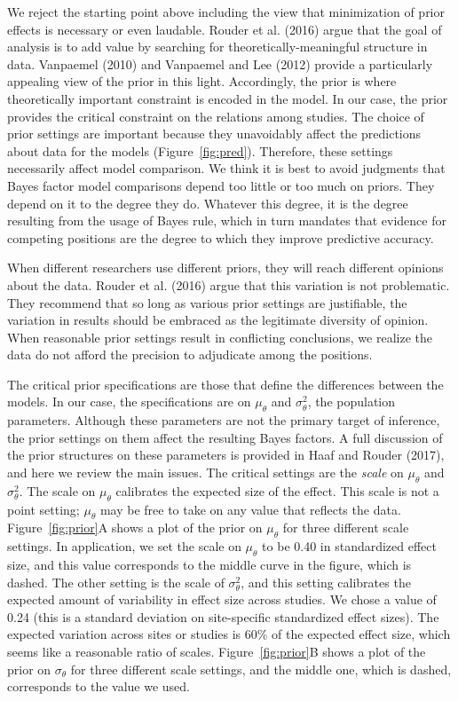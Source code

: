 \documentclass[english,man]{apa6}
\theoremstyle{definition}
\theoremstyle{definition}
\theoremstyle{definition}
\theoremstyle{remark}
\begin{document}
We reject the starting point above including the view that minimization
of prior effects is necessary or even laudable. Rouder et al. (2016)
argue that the goal of analysis is to add value by searching for
theoretically-meaningful structure in data. Vanpaemel (2010) and
Vanpaemel and Lee (2012) provide a particularly appealing view of the
prior in this light. Accordingly, the prior is where theoretically
important constraint is encoded in the model. In our case, the prior
provides the critical constraint on the relations among studies. The
choice of prior settings are important because they unavoidably affect
the predictions about data for the models (Figure~\ref{fig:pred}).
Therefore, these settings necessarily affect model comparison. We think
it is best to avoid judgments that Bayes factor model comparisons depend
too little or too much on priors. They depend on it to the degree they
do. Whatever this degree, it is the degree resulting from the usage of
Bayes rule, which in turn mandates that evidence for competing positions
are the degree to which they improve predictive accuracy.

When different researchers use different priors, they will reach
different opinions about the data. Rouder et al. (2016) argue that this
variation is not problematic. They recommend that so long as various
prior settings are justifiable, the variation in results should be
embraced as the legitimate diversity of opinion. When reasonable prior
settings result in conflicting conclusions, we realize the data do not
afford the precision to adjudicate among the positions.

The critical prior specifications are those that define the differences
between the models. In our case, the specifications are on
\(\mu_\theta\) and \(\sigma^2_\theta\), the population parameters.
Although these parameters are not the primary target of inference, the
prior settings on them affect the resulting Bayes factors. A full
discussion of the prior structures on these parameters is provided in
Haaf and Rouder (2017), and here we review the main issues. The critical
settings are the \emph{scale} on \(\mu_\theta\) and \(\sigma^2_\theta\).
The scale on \(\mu_\theta\) calibrates the expected size of the effect.
This scale is not a point setting; \(\mu_\theta\) may be free to take on
any value that reflects the data. Figure~\ref{fig:prior}A shows a plot
of the prior on \(\mu_\theta\) for three different scale settings. In
application, we set the scale on \(\mu_\theta\) to be 0.40 in
standardized effect size, and this value corresponds to the middle curve
in the figure, which is dashed. The other setting is the scale of
\(\sigma^2_\theta\), and this setting calibrates the expected amount of
variability in effect size across studies. We chose a value of 0.24
(this is a standard deviation on site-specific standardized effect
sizes). The expected variation across sites or studies is 60\% of the
expected effect size, which seems like a reasonable ratio of scales.
Figure~\ref{fig:prior}B shows a plot of the prior on \(\sigma_\theta\)
for three different scale settings, and the middle one, which is dashed,
corresponds to the value we used.
\end{document}
